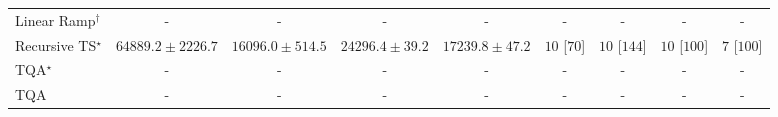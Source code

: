 \begin{tabular}{l|cccc|cccc|}
Linear Ramp$^\dagger$ & {\cellcolor[HTML]{000000}} \color[HTML]{F1F1F1} {\cellcolor{white}} \color{black} - & {\cellcolor[HTML]{000000}} \color[HTML]{F1F1F1} {\cellcolor{white}} \color{black} - & {\cellcolor[HTML]{000000}} \color[HTML]{F1F1F1} {\cellcolor{white}} \color{black} - & {\cellcolor[HTML]{000000}} \color[HTML]{F1F1F1} {\cellcolor{white}} \color{black} - & {\cellcolor[HTML]{000000}} \color[HTML]{F1F1F1} {\cellcolor{white}} \color{black} - & {\cellcolor[HTML]{000000}} \color[HTML]{F1F1F1} {\cellcolor{white}} \color{black} - & {\cellcolor[HTML]{000000}} \color[HTML]{F1F1F1} {\cellcolor{white}} \color{black} - & {\cellcolor[HTML]{000000}} \color[HTML]{F1F1F1} {\cellcolor{white}} \color{black} - \\
Recursive TS$^\star$ & {\cellcolor[HTML]{873696}} \color[HTML]{F1F1F1} $64889.2\pm 2226.7$ & {\cellcolor[HTML]{F0F7FA}} \color[HTML]{000000} $16096.0\pm 514.5$ & {\cellcolor[HTML]{D6E4F0}} \color[HTML]{000000} $24296.4\pm 39.2$ & {\cellcolor[HTML]{ECF4F9}} \color[HTML]{000000} $17239.8\pm 47.2$ & {\cellcolor[HTML]{49006A}} \color[HTML]{F1F1F1} $10$ [$70$] & {\cellcolor[HTML]{49006A}} \color[HTML]{F1F1F1} $10$ [$144$] & {\cellcolor[HTML]{49006A}} \color[HTML]{F1F1F1} $10$ [$100$] & {\cellcolor[HTML]{CD238F}} \color[HTML]{F1F1F1} $7$ [$100$] \\
TQA$^\star$ & {\cellcolor[HTML]{000000}} \color[HTML]{F1F1F1} {\cellcolor{white}} \color{black} - & {\cellcolor[HTML]{000000}} \color[HTML]{F1F1F1} {\cellcolor{white}} \color{black} - & {\cellcolor[HTML]{000000}} \color[HTML]{F1F1F1} {\cellcolor{white}} \color{black} - & {\cellcolor[HTML]{000000}} \color[HTML]{F1F1F1} {\cellcolor{white}} \color{black} - & {\cellcolor[HTML]{000000}} \color[HTML]{F1F1F1} {\cellcolor{white}} \color{black} - & {\cellcolor[HTML]{000000}} \color[HTML]{F1F1F1} {\cellcolor{white}} \color{black} - & {\cellcolor[HTML]{000000}} \color[HTML]{F1F1F1} {\cellcolor{white}} \color{black} - & {\cellcolor[HTML]{000000}} \color[HTML]{F1F1F1} {\cellcolor{white}} \color{black} - \\
TQA & {\cellcolor[HTML]{000000}} \color[HTML]{F1F1F1} {\cellcolor{white}} \color{black} - & {\cellcolor[HTML]{000000}} \color[HTML]{F1F1F1} {\cellcolor{white}} \color{black} - & {\cellcolor[HTML]{000000}} \color[HTML]{F1F1F1} {\cellcolor{white}} \color{black} - & {\cellcolor[HTML]{000000}} \color[HTML]{F1F1F1} {\cellcolor{white}} \color{black} - & {\cellcolor[HTML]{000000}} \color[HTML]{F1F1F1} {\cellcolor{white}} \color{black} - & {\cellcolor[HTML]{000000}} \color[HTML]{F1F1F1} {\cellcolor{white}} \color{black} - & {\cellcolor[HTML]{000000}} \color[HTML]{F1F1F1} {\cellcolor{white}} \color{black} - & {\cellcolor[HTML]{000000}} \color[HTML]{F1F1F1} {\cellcolor{white}} \color{black} - \\

\end{tabular}
